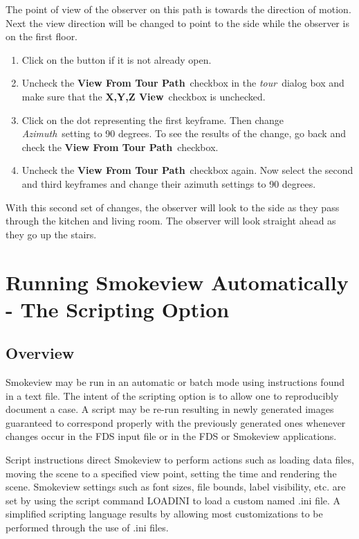 \documentclass[11pt,twoside]{book}
\newcommand{\frameit}[1]{\fbox{\tt #1}}
\begin{document}
The point of view of the observer on this path is towards the
direction of motion. Next the view direction will be changed to
point to the side while the observer is on the first floor.

\begin{enumerate}
\item Click on the \frameit{Advanced Settings} button if it is not already open.

\item Uncheck the {\bf View From Tour Path}\ checkbox in the {\em
tour}\ dialog box and make sure that the {\bf X,Y,Z View}\
checkbox is unchecked.

\item Click on the dot representing the first keyframe. Then
change {\em Azimuth}\ setting to 90 degrees.  To see the results
of the change, go back and check the {\bf View From Tour Path}\
checkbox.

\item Uncheck the {\bf View From Tour Path}\ checkbox again. Now
select the second and third keyframes and change their azimuth
settings to 90 degrees.
\end{enumerate}

With this second set of changes, the observer will look to the
side as they pass through the kitchen and living room.  The
observer will look straight ahead as they go up the stairs.


\chapter{Running Smokeview Automatically - The Scripting Option}
\section{Overview}
Smokeview may be run in an automatic or batch mode using
instructions found in a text file.
The intent of the scripting option is to allow one to reproducibly document a case.
A script may be re-run resulting in newly generated images guaranteed to correspond properly with the previously generated
ones whenever changes occur in the FDS input file or in the FDS or Smokeview applications.

Script instructions direct Smokeview to perform actions such as loading data files, moving the scene to a specified view point, setting the time and rendering the scene.
Smokeview settings such as font sizes, file bounds, label visibility,
etc. are set by using the script command LOADINI to load a custom named .ini file.
A simplified scripting language results by allowing
most customizations to be performed through the use of .ini files.
\end{document}

